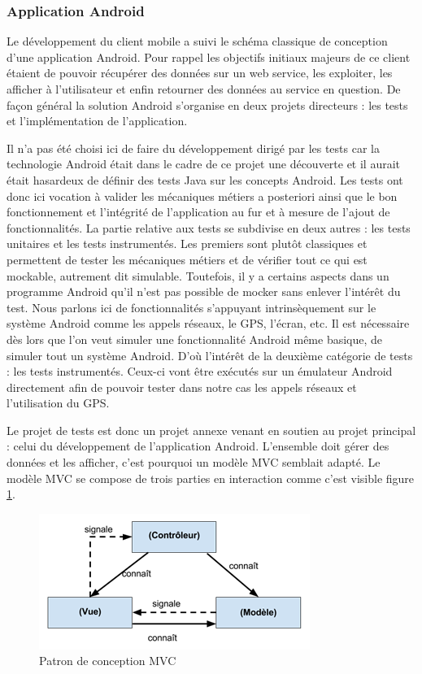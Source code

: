 \subsubsection{Application Android}
Le développement du client mobile a suivi le schéma classique de conception d’une application Android. Pour rappel les objectifs initiaux majeurs de ce client étaient de pouvoir récupérer des données sur un web service, les exploiter, les afficher à l’utilisateur et enfin retourner des données au service en question. De façon général la solution Android s’organise en deux projets directeurs : les tests et l’implémentation de l’application.

Il n’a pas été choisi ici de faire du développement dirigé par les tests car la technologie Android était dans le cadre de ce projet une découverte et il aurait était hasardeux de définir des tests Java sur les concepts Android. Les tests ont donc ici vocation à valider les mécaniques métiers a posteriori ainsi que le bon fonctionnement et l’intégrité de l’application au fur et à mesure de l’ajout de fonctionnalités. La partie relative aux tests se subdivise en deux autres : les tests unitaires et les tests instrumentés. Les premiers sont plutôt classiques et permettent de tester les mécaniques métiers et de vérifier tout ce qui est mockable, autrement dit simulable. Toutefois, il y a certains aspects dans un programme Android qu’il n’est pas possible de mocker sans enlever l’intérêt du test. Nous parlons ici de fonctionnalités s’appuyant intrinsèquement sur le système Android comme les appels réseaux, le GPS, l’écran, etc. Il est nécessaire dès lors que l’on veut simuler une fonctionnalité Android même basique, de simuler tout un système Android. D’où l’intérêt de la deuxième catégorie de tests : les tests instrumentés. Ceux-ci vont être exécutés sur un émulateur Android directement afin de pouvoir tester dans notre cas les appels réseaux et l’utilisation du GPS.

Le projet de tests est donc un projet annexe venant en soutien au projet principal : celui du développement de l’application Android. L’ensemble doit gérer des données et les afficher, c’est pourquoi un modèle MVC semblait adapté. Le modèle MVC se compose de trois parties en interaction comme c’est visible figure \ref{mvc}.

\begin{figure}[H]
    \centering
    \includegraphics[width=\textwidth]{./img/mvc.png}
    \caption{Patron de conception MVC}
    \label{mvc}
\end{figure}

